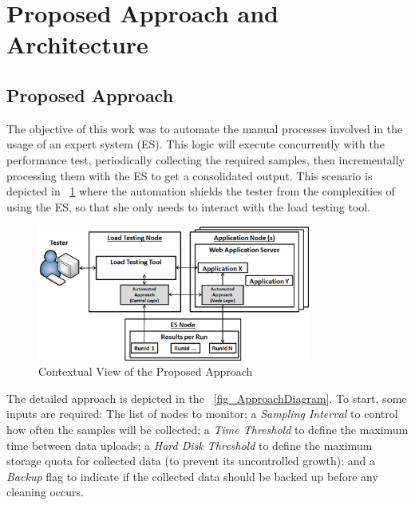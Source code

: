 \documentclass[runningheads,a4paper]{llncs}
\newcommand{\myspaceM}{-7.6pt}
\begin{document}
\vspace{\myspaceM{}}
\section{Proposed Approach and Architecture}
\label{ProposedApproach}
\vspace{\myspaceM{}}

\subsection{Proposed Approach}
\vspace{\myspaceM{}}
The objective of this work was to automate the manual processes involved
in the usage of an expert system (ES). This logic will execute concurrently with
the performance test, periodically collecting the required samples, then
incrementally processing them with the ES to get a consolidated
output. This scenario is depicted in \figurename ~\ref{fig_Overview} where the
automation shields the tester from the complexities of using the ES, so
that she only needs to interact with the load testing tool.

\vspace{-1pt}
\begin{figure}[!h]
\centering
\includegraphics[totalheight=.17\textheight,width=0.8\textwidth]{architecture_dwait}
\caption{Contextual View of the Proposed Approach}
\label{fig_Overview}
\end{figure}

The detailed approach is depicted in the \figurename
~\ref{fig_ApproachDiagram}. To start, some inputs  are required: The list of 
nodes to monitor; a \emph{Sampling Interval} to control how
often the samples will be collected; a \emph{Time Threshold} to define the maximum 
time between data uploads; a \emph{Hard Disk Threshold} to define the maximum
storage quota for collected data (to prevent its uncontrolled growth); and a
\emph{Backup} flag to indicate if the collected data should be backed up before any 
cleaning occurs.
\end{document}

